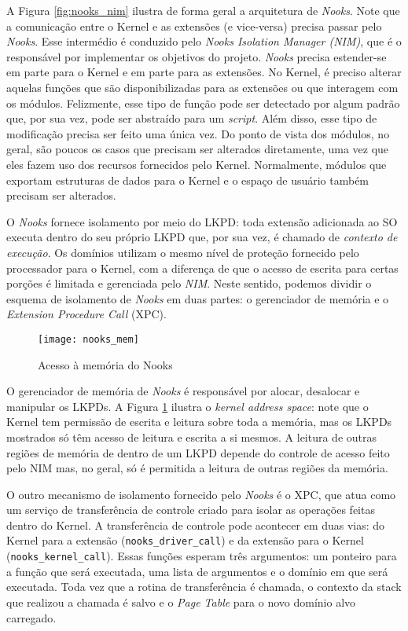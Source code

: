 A Figura \ref{fig:nooks_nim} ilustra de forma geral a arquitetura de
\emph{Nooks}. Note que a comunicação entre o Kernel e as extensões (e vice-versa)
precisa passar pelo \emph{Nooks}. Esse intermédio é conduzido pelo \emph{Nooks
Isolation Manager (NIM)}, que é o responsável por implementar os objetivos do
projeto. \emph{Nooks} precisa estender-se em parte para o Kernel e em parte
para as extensões. No Kernel, é preciso alterar aquelas funções que são
disponibilizadas para as extensões ou que interagem com os módulos. Felizmente,
esse tipo de função pode ser detectado por algum padrão que, por sua vez, pode
ser abstraído para um \emph{script}. Além disso, esse tipo de modificação precisa ser
feito uma única vez. Do ponto de vista dos módulos, no geral, são poucos os
casos que precisam ser alterados diretamente, uma vez que eles fazem uso dos
recursos fornecidos pelo Kernel. Normalmente, módulos que exportam estruturas
de dados para o Kernel e o espaço de usuário também precisam ser alterados.

O \emph{Nooks} fornece isolamento por meio do LKPD: toda extensão
adicionada ao SO executa dentro do seu próprio LKPD que, por sua vez, é chamado
de \emph{contexto de execução}. Os domínios utilizam o mesmo nível de proteção
fornecido pelo processador para o Kernel, com a diferença de que o acesso de
escrita para certas porções é limitada e gerenciada pelo \emph{NIM}. Neste
sentido, podemos dividir o esquema de isolamento de \emph{Nooks} em duas partes:
o gerenciador de memória e o \emph{Extension Procedure Call} (XPC).

\begin{figure}[!h]
  \centering
  \texttt{[image: nooks\_mem]}
  \caption[Acesso à memória do Nooks]{Acesso à memória do Nooks \citep{nooks}}
  \label{fig:nooks_mem}
\end{figure}

O gerenciador de memória de \emph{Nooks} é responsável por alocar, desalocar e
manipular os LKPDs. A Figura \ref{fig:nooks_mem} ilustra o \textit{kernel
address space}: note que o Kernel tem permissão de escrita e leitura sobre toda
a memória, mas os LKPDs mostrados só têm acesso de leitura e escrita a si mesmos.
A leitura de outras regiões de memória de dentro de um LKPD depende do controle
de acesso feito pelo NIM mas, no geral, só é permitida a leitura de outras
regiões da memória.

O outro mecanismo de isolamento fornecido pelo \emph{Nooks} é o XPC, que atua
como um serviço de transferência de controle criado para isolar as operações
feitas dentro do Kernel. A transferência de controle pode acontecer em duas
vias: do Kernel para a extensão (\texttt{nooks\_driver\_call}) e da extensão
para o Kernel (\texttt{nooks\_kernel\_call}). Essas funções esperam
três argumentos: um ponteiro para a função que será executada, uma lista de
argumentos e o domínio em que será executada. Toda vez que a rotina de
transferência é chamada, o contexto da stack que realizou a chamada é salvo e o
\emph{Page Table} para o novo domínio alvo carregado.

